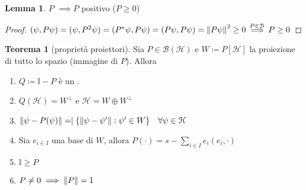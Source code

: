 \documentclass[a4paper,10pt]{article}
\theoremstyle{definition}
\newcommand{\id}{\mathbb{I}} %
\newcommand{\hil}{\mathcal{H}} %
\theoremstyle{indentdefinition}
\theoremstyle{indenttheorem}
\newtheorem{thm}{Teorema}
\newtheorem{lem*}{Lemma}
\theoremstyle{myremark}
\theoremstyle{indentgeneral}
\newenvironment{myboxed} 
{\noindent\begin{lrbox}{\mybox}\begin{minipage}{\textwidth}}
{\end{minipage}\end{lrbox}\fbox{\usebox{\mybox}}}
\begin{document}
\begin{myboxed}
\begin{lem*}
    $P$  $\implies P$ positivo ($P\ge 0$)
\end{lem*}
\end{myboxed}

\begin{proof}
    $(\psi,P\psi)=(\psi,P^2\psi)=(P^*\psi,P\psi)=(P\psi,P\psi)=\norm{P\psi}^2\ge0\overset{P\in\mathcal{B}}{\implies}P\ge 0$
\end{proof}

\begin{myboxed}
\begin{thm}[proprietà proiettori]\label{thm-proprietà-proiettori}
    Sia $P\in\mathcal{B}(\hil)$   e $W\coloneqq P[\hil]$ la proiezione di tutto lo spazio (immagine di $P$). Allora
    \begin{enumerate}
        \item $Q\coloneqq \id-P$ è un .
        \item $Q(\hil)=W^\perp$ e $\hil = W\oplus W^\perp$
        \item $\norm{\psi-P(\psi)}=\mid\{\norm{\psi-\psi'}:\psi'\in W\}\quad  \forall\psi\in\hil$
        \item Sia $e_{i\in I}$ una base di $W$, allora $P(\cdot)=s-\sum_{i\in I}e_i(e_i,\cdot)$
        \item $\id\ge P$ 
        \item $P\ne 0\implies \norm{P}=1$
    \end{enumerate}
\end{thm}
\end{myboxed}
\end{document}
